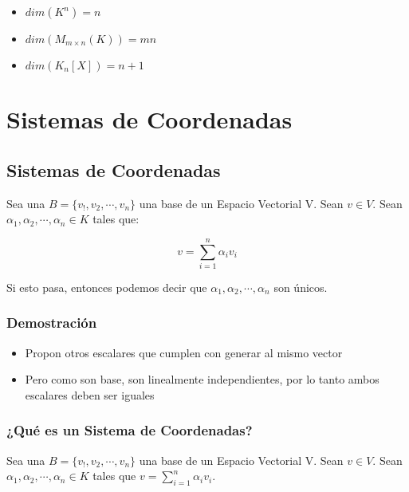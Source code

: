 \documentclass[12pt]{report}							    %
\begin{document}
        \begin{itemize}
            \item $dim(K^n) = n$
            \item $dim(M_{m \times n}(K)) = mn$
            \item $dim(K_{n}{[X]}) = n + 1$
        \end{itemize}


\chapter{Sistemas de Coordenadas}
    \clearpage

    \section{Sistemas de Coordenadas}

        Sea una $B = \{ v_!, v_2, \cdots, v_n\}$ una base de un Espacio Vectorial V.
        Sean $v \in V$.
        Sean $\alpha_1, \alpha_2, \cdots, \alpha_n \in K$ tales que:

        \begin{equation}
            v = \sum_{i=1}^{n} \alpha_i v_i
        \end{equation}

        Si esto pasa, entonces podemos decir que  $\alpha_1, \alpha_2, \cdots, \alpha_n$ son únicos.

        \subsection{Demostración}
        \begin{itemize}
            \item Propon otros escalares que cumplen con generar al mismo vector
            \item Pero como son base, son linealmente independientes, por lo tanto ambos escalares deben ser iguales
        \end{itemize}


        \subsection{¿Qué es un Sistema de Coordenadas?}
        Sea una $B = \{ v_!, v_2, \cdots, v_n\}$ una base de un Espacio Vectorial V.
        Sean $v \in V$.
        Sean $\alpha_1, \alpha_2, \cdots, \alpha_n \in K$ tales que $v = \sum_{i=1}^{n} \alpha_i v_i$.
\end{document}
